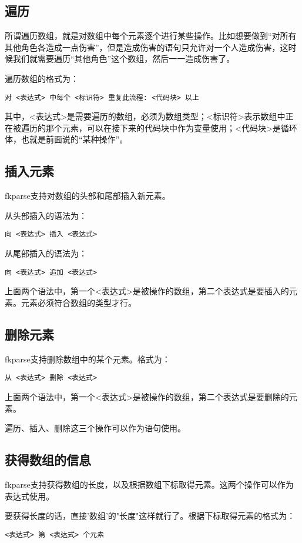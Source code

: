 \subsection{遍历}

所谓遍历数组，就是对数组中每个元素逐个进行某些操作。比如想要做到“对所有其他角色各造成一点伤害”，但是造成伤害的语句只允许对一个人造成伤害，这时候我们就需要遍历“其他角色”这个数组，然后一一造成伤害了。

遍历数组的格式为：

\begin{verbatim}
对 <表达式> 中每个 <标识符> 重复此流程: <代码块> 以上
\end{verbatim}

其中，<表达式>是需要遍历的数组，必须为数组类型；<标识符>表示数组中正在被遍历的那个元素，可以在接下来的代码块中作为变量使用；<代码块>是循环体，也就是前面说的“某种操作”。

\subsection{插入元素}

fkparse支持对数组的头部和尾部插入新元素。

从头部插入的语法为：

\begin{verbatim}
向 <表达式> 插入 <表达式>
\end{verbatim}

从尾部插入的语法为：

\begin{verbatim}
向 <表达式> 追加 <表达式>
\end{verbatim}

上面两个语法中，第一个<表达式>是被操作的数组，第二个表达式是要插入的元素。元素必须符合数组的类型才行。

\subsection{删除元素}

fkparse支持删除数组中的某个元素。格式为：

\begin{verbatim}
从 <表达式> 删除 <表达式>
\end{verbatim}

上面两个语法中，第一个<表达式>是被操作的数组，第二个表达式是要删除的元素。

遍历、插入、删除这三个操作可以作为语句使用。

\subsection{获得数组的信息}

fkparse支持获得数组的长度，以及根据数组下标取得元素。这两个操作可以作为表达式使用。

要获得长度的话，直接'数组'的"长度"这样就行了。根据下标取得元素的格式为：

\begin{verbatim}
<表达式> 第 <表达式> 个元素
\end{verbatim}
